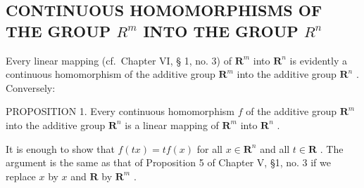 \subsection{\texorpdfstring{CONTINUOUS HOMOMORPHISMS OF THE GROUP \(R^{m}\) INTO THE GROUP \(R^{n}\)}{CONTINUOUS HOMOMORPHISMS OF THE GROUP R TO THE M INTO THE GROUP R TO THE N}}

Every linear mapping (cf.~Chapter VI, § 1, no. 3) of \(\mathbf{R}^{m}\) into \(\mathbf{R}^{n}\) is evidently a continuous homomorphism of the additive group \(\mathbf{R}^{m}\) into the additive group \(\mathbf{R}^{n}\) . Conversely:

PROPOSITION 1. Every continuous homomorphism \(f\) of the additive group \(\mathbf{R}^m\) into the additive group \(\mathbf{R}^n\) is a linear mapping of \(\mathbf{R}^m\) into \(\mathbf{R}^n\) .

It is enough to show that \(f(tx) = tf(x)\) for all \(x \in \mathbf{R}^n\) and all \(t \in \mathbf{R}\) . The argument is the same as that of Proposition 5 of Chapter V, §1, no. 3 if we replace \(x\) by \(x\) and \(\mathbf{R}\) by \(\mathbf{R}^m\) .

